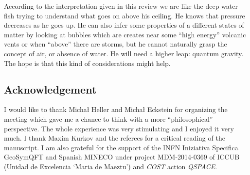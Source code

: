 \documentclass[12pt,a4paper]{article}
\begin{document}
According to the interpretation given in this review we are like the deep water fish trying to understand what goes on above his ceiling.
He knows that pressure decreases as he goes up. He can also infer some properties of a different states of matter by looking at bubbles which are creates near some ``high energy'' volcanic vents or when ``above'' there are storms, but he cannot naturally grasp the concept of air, or absence of water.
He will need a higher leap: quantum gravity. The hope is that this kind of considerations might help.

\subsection*{Acknowledgement}
I would like to thank Micha\l{} Heller and Micha\l{} Eckstein for organizing the meeting which gave me a chance to think with a more ``philosophical'' perspective. The whole experience was very stimulating and I enjoyed it very much. I thank Maxim Kurkov and the referees for a critical reading of the manuscript.
I am also grateful for the support of the INFN Iniziativa Specifica GeoSymQFT and Spanish
MINECO under project MDM-2014-0369 of ICCUB (Unidad de Excelencia `Maria de Maeztu') and  {\sl COST} action \emph{QSPACE}.
\end{document}
